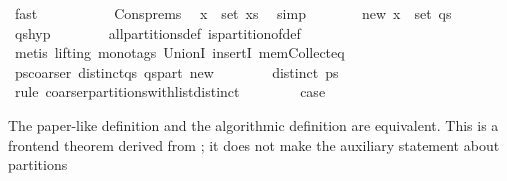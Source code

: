 \begin{isabellebody}
\ fast\isanewline
\ \ \ \ \isanewline
\ \ \ \ \isamarkupfalse%
\ Cons{\isachardot}prems\ \isamarkupfalse%
\ {\isachardoublequoteopen}x\ {\isasymnotin}\ set\ xs{\isachardoublequoteclose}\ \isamarkupfalse%
\ simp\isanewline
\ \ \ \ \isamarkupfalse%
\ \isamarkupfalse%
\ new{\isacharcolon}\ {\isachardoublequoteopen}{\isacharbraceleft}x{\isacharbraceright}\ {\isasymnotin}\ set\ qs{\isachardoublequoteclose}\isanewline
\ \ \ \ \ \ \isamarkupfalse%
\ qs{\isacharunderscore}hyp\isanewline
\ \ \ \ \ \ \isamarkupfalse%
\ all{\isacharunderscore}partitions{\isacharunderscore}def\ is{\isacharunderscore}partition{\isacharunderscore}of{\isacharunderscore}def\isanewline
\ \ \ \ \ \ \isamarkupfalse%
\ {\isacharparenleft}metis\ {\isacharparenleft}lifting{\isacharcomma}\ mono{\isacharunderscore}tags{\isacharparenright}\ UnionI\ insertI{}\ mem{\isacharunderscore}Collect{\isacharunderscore}eq{\isacharparenright}\isanewline
\isanewline
\ \ \ \ \isamarkupfalse%
\ ps{\isacharunderscore}coarser\ distinct{\isacharunderscore}qs\ qs{\isacharunderscore}part\ new\isanewline
\ \ \ \ \ \ \isamarkupfalse%
\ {\isachardoublequoteopen}distinct\ ps{\isachardoublequoteclose}\ \isamarkupfalse%
\ {\isacharparenleft}rule\ coarser{\isacharunderscore}partitions{\isacharunderscore}with{\isacharunderscore}list{\isacharunderscore}distinct{\isacharparenright}\isanewline
\ \ \isamarkupfalse%
\isanewline
\ \ \isamarkupfalse%
\ \isamarkupfalse%
\ {\isacharquery}case\ \isacommand{{\isachardot}{\isachardot}}\isamarkupfalse%
\isanewline
{}\isamarkupfalse%
%
\endisatagproof
{\isafoldproof}%
%
\isadelimproof
%
\endisadelimproof
%
\begin{isamarkuptext}%
The paper-like definition  and the algorithmic definition
   are equivalent.  This is a frontend theorem derived from
  ; it does not make the auxiliary statement about partitions

\end{isamarkuptext}
\end{isabellebody}
